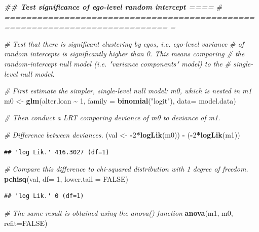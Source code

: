 \documentclass[
]{book}
\newenvironment{Shaded}{\begin{snugshade}}{\end{snugshade}}
\newcommand{\AttributeTok}[1]{\textcolor[rgb]{0.13,0.29,0.53}{#1}}
\newcommand{\CommentTok}[1]{\textcolor[rgb]{0.56,0.35,0.01}{\textit{#1}}}
\newcommand{\ConstantTok}[1]{\textcolor[rgb]{0.56,0.35,0.01}{#1}}
\newcommand{\DecValTok}[1]{\textcolor[rgb]{0.00,0.00,0.81}{#1}}
\newcommand{\DocumentationTok}[1]{\textcolor[rgb]{0.56,0.35,0.01}{\textbf{\textit{#1}}}}
\newcommand{\FunctionTok}[1]{\textcolor[rgb]{0.13,0.29,0.53}{\textbf{#1}}}
\newcommand{\NormalTok}[1]{#1}
\newcommand{\OtherTok}[1]{\textcolor[rgb]{0.56,0.35,0.01}{#1}}
\newcommand{\SpecialCharTok}[1]{\textcolor[rgb]{0.81,0.36,0.00}{\textbf{#1}}}
\newcommand{\StringTok}[1]{\textcolor[rgb]{0.31,0.60,0.02}{#1}}
\begin{document}
\begin{Shaded}
\begin{Highlighting}[]
\DocumentationTok{\#\# Test significance of ego{-}level random intercept                          ====}
\CommentTok{\# ============================================================================ =}

\CommentTok{\# Test that there is significant clustering by egos, i.e. ego{-}level variance}
\CommentTok{\# of random intercepts is significantly higher than 0. This means comparing}
\CommentTok{\# the random{-}intercept null model (i.e. "variance components" model) to the }
\CommentTok{\# single{-}level null model.}

\CommentTok{\# First estimate the simpler, single{-}level null model: m0, which is nested in m1}
\NormalTok{m0 }\OtherTok{\textless{}{-}} \FunctionTok{glm}\NormalTok{(alter.loan }\SpecialCharTok{\textasciitilde{}} \DecValTok{1}\NormalTok{, }\AttributeTok{family =} \FunctionTok{binomial}\NormalTok{(}\StringTok{"logit"}\NormalTok{), }\AttributeTok{data=}\NormalTok{ model.data)}

\CommentTok{\# Then conduct a LRT comparing deviance of m0 to deviance of m1.}

\CommentTok{\# Difference between deviances.}
\NormalTok{(val }\OtherTok{\textless{}{-}} \SpecialCharTok{{-}}\DecValTok{2}\SpecialCharTok{*}\FunctionTok{logLik}\NormalTok{(m0)) }\SpecialCharTok{{-}}\NormalTok{ (}\SpecialCharTok{{-}}\DecValTok{2}\SpecialCharTok{*}\FunctionTok{logLik}\NormalTok{(m1))}
\end{Highlighting}
\end{Shaded}

\begin{verbatim}
## 'log Lik.' 416.3027 (df=1)
\end{verbatim}

\begin{Shaded}
\begin{Highlighting}[]
\CommentTok{\# Compare this difference to chi{-}squared distribution with 1 degree of freedom.}
\FunctionTok{pchisq}\NormalTok{(val, }\AttributeTok{df=} \DecValTok{1}\NormalTok{, }\AttributeTok{lower.tail =} \ConstantTok{FALSE}\NormalTok{)}
\end{Highlighting}
\end{Shaded}

\begin{verbatim}
## 'log Lik.' 0 (df=1)
\end{verbatim}

\begin{Shaded}
\begin{Highlighting}[]
\CommentTok{\# The same result is obtained using the anova() function}
\FunctionTok{anova}\NormalTok{(m1, m0, }\AttributeTok{refit=}\ConstantTok{FALSE}\NormalTok{)}
\end{Highlighting}
\end{Shaded}
\end{document}
